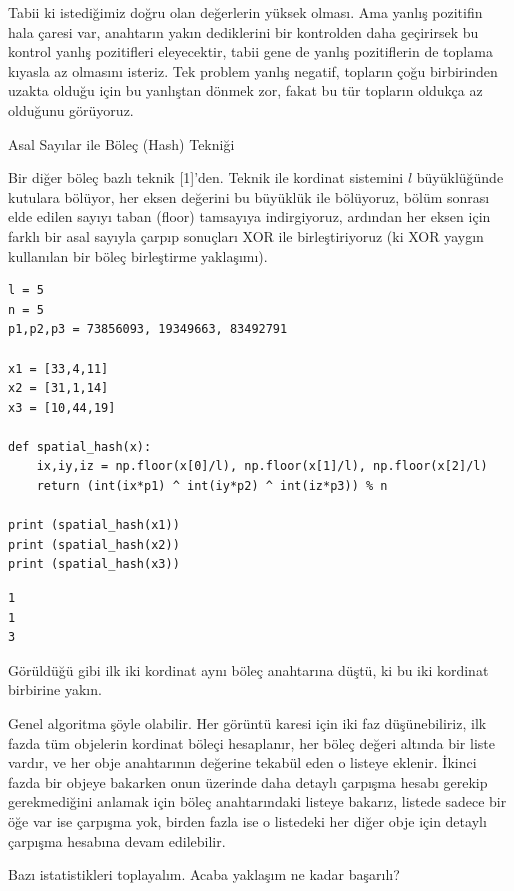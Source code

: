 \documentclass[12pt,fleqn]{article}\usepackage{../../common}
\begin{document}
Tabii ki istediğimiz doğru olan değerlerin yüksek olması. Ama yanlış pozitifin
hala çaresi var, anahtarın yakın dediklerini bir kontrolden daha geçirirsek bu
kontrol yanlış pozitifleri eleyecektir, tabii gene de yanlış pozitiflerin de
toplama kıyasla az olmasını isteriz. Tek problem yanlış negatif, topların çoğu
birbirinden uzakta olduğu için bu yanlıştan dönmek zor, fakat bu tür topların
oldukça az olduğunu görüyoruz.

Asal Sayılar ile Böleç (Hash) Tekniği

Bir diğer böleç bazlı teknik [1]'den. Teknik ile kordinat sistemini $l$
büyüklüğünde kutulara bölüyor, her eksen değerini bu büyüklük ile bölüyoruz,
bölüm sonrası elde edilen sayıyı taban (floor) tamsayıya indirgiyoruz, ardından
her eksen için farklı bir asal sayıyla çarpıp sonuçları XOR ile birleştiriyoruz
(ki XOR yaygın kullanılan bir böleç birleştirme yaklaşımı).

\begin{verbatim}
l = 5
n = 5
p1,p2,p3 = 73856093, 19349663, 83492791

x1 = [33,4,11]
x2 = [31,1,14]
x3 = [10,44,19]

def spatial_hash(x):
    ix,iy,iz = np.floor(x[0]/l), np.floor(x[1]/l), np.floor(x[2]/l)
    return (int(ix*p1) ^ int(iy*p2) ^ int(iz*p3)) % n

print (spatial_hash(x1))
print (spatial_hash(x2))
print (spatial_hash(x3))
\end{verbatim}

\begin{verbatim}
1
1
3
\end{verbatim}

Görüldüğü gibi ilk iki kordinat aynı böleç anahtarına düştü, ki bu iki kordinat
birbirine yakın.

Genel algoritma şöyle olabilir. Her görüntü karesi için iki faz düşünebiliriz,
ilk fazda tüm objelerin kordinat böleçi hesaplanır, her böleç değeri altında bir
liste vardır, ve her obje anahtarının değerine tekabül eden o listeye
eklenir. İkinci fazda bir objeye bakarken onun üzerinde daha detaylı çarpışma
hesabı gerekip gerekmediğini anlamak için böleç anahtarındaki listeye bakarız,
listede sadece bir öğe var ise çarpışma yok, birden fazla ise o listedeki her
diğer obje için detaylı çarpışma hesabına devam edilebilir.

Bazı istatistikleri toplayalım. Acaba yaklaşım ne kadar başarılı?
\end{document}
